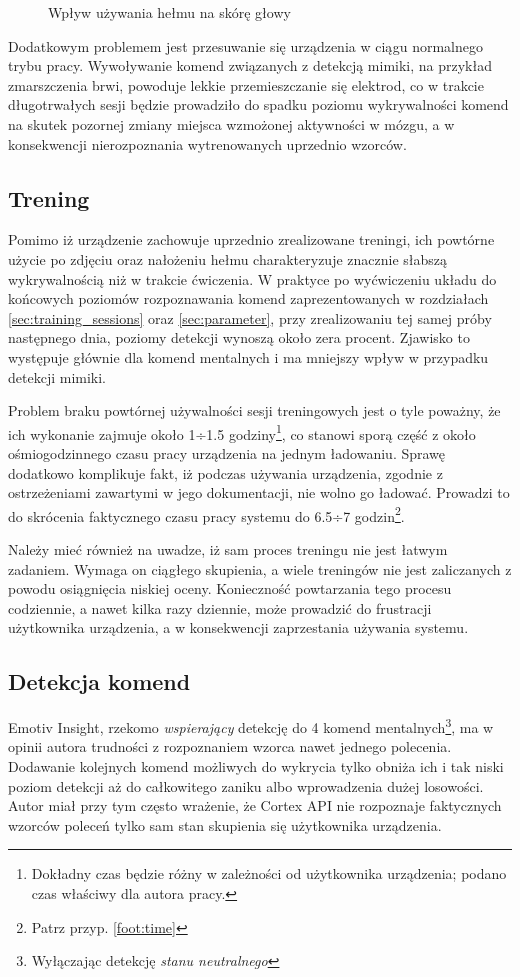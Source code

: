 \documentclass[skorowidz,skroty]{dyplomWEZUT}
\begin{document}
\begin{figure}[htb]
    \caption{Wpływ używania hełmu na skórę głowy\label{fig:headset_marks}}
\end{figure}

Dodatkowym problemem jest przesuwanie się urządzenia w ciągu normalnego trybu pracy. Wywoływanie komend związanych z detekcją mimiki, na przykład zmarszczenia brwi, powoduje lekkie przemieszczanie się elektrod, co w trakcie długotrwałych sesji będzie prowadziło do spadku poziomu wykrywalności komend na skutek pozornej zmiany miejsca wzmożonej aktywności w mózgu, a w konsekwencji nierozpoznania wytrenowanych uprzednio wzorców.

\subsection{Trening}
Pomimo iż urządzenie zachowuje uprzednio zrealizowane treningi, ich powtórne użycie po zdjęciu oraz nałożeniu hełmu charakteryzuje znacznie słabszą wykrywalnością niż w trakcie ćwiczenia. W praktyce po wyćwiczeniu układu do końcowych poziomów rozpoznawania komend zaprezentowanych w rozdziałach \vref{sec:training_sessions} oraz \vref{sec:parameter}, przy zrealizowaniu tej samej próby następnego dnia, poziomy detekcji wynoszą około zera procent. Zjawisko to występuje głównie dla komend mentalnych i ma mniejszy wpływ w przypadku detekcji mimiki.

Problem braku powtórnej używalności sesji treningowych jest o tyle poważny, że ich wykonanie zajmuje około 1÷1.5 godziny\footnote{Dokładny czas będzie różny w zależności od użytkownika urządzenia; podano czas właściwy dla autora pracy.\label{foot:time}}, co stanowi sporą część z około ośmiogodzinnego czasu pracy urządzenia na jednym ładowaniu. Sprawę dodatkowo komplikuje fakt, iż podczas używania urządzenia, zgodnie z ostrzeżeniami zawartymi w jego dokumentacji, nie wolno go ładować. Prowadzi to do skrócenia faktycznego czasu pracy systemu do 6.5÷7 godzin\footnote{Patrz przyp. \vref{foot:time}}.

Należy mieć również na uwadze, iż sam proces treningu nie jest łatwym zadaniem. Wymaga on ciągłego skupienia, a wiele treningów nie jest zaliczanych z powodu osiągnięcia niskiej oceny. Konieczność powtarzania tego procesu codziennie, a nawet kilka razy dziennie, może prowadzić do frustracji użytkownika urządzenia, a w konsekwencji zaprzestania używania systemu. 

\subsection{Detekcja komend}
Emotiv Insight, rzekomo \textit{wspierający} detekcję do 4 komend mentalnych\footnote{Wyłączając detekcję \textit{stanu neutralnego}}, ma w opinii autora trudności z rozpoznaniem wzorca nawet jednego polecenia. Dodawanie kolejnych komend możliwych do wykrycia tylko obniża ich i tak niski poziom detekcji aż do całkowitego zaniku albo wprowadzenia dużej losowości. Autor miał przy tym często wrażenie, że Cortex API nie rozpoznaje faktycznych wzorców poleceń tylko sam stan skupienia się użytkownika urządzenia.
\end{document}
